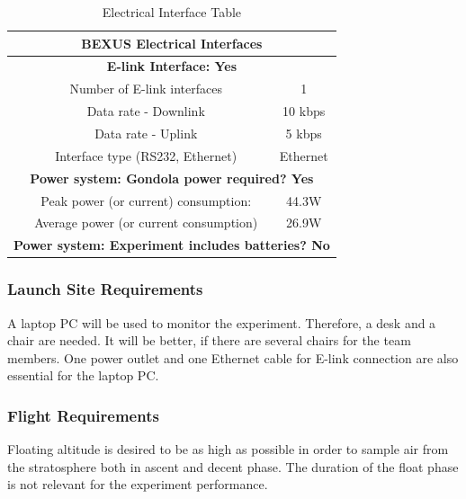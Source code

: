 \documentclass[a4paper,12pt,twoside]{article}
\begin{document}
\begin{table}[H]
\centering
\begin{tabular}{|c|c|c|}
\hline
\multicolumn{3}{|c|}{\textbf{BEXUS Electrical Interfaces}}                     \\ \hline
\multicolumn{3}{|c|}{\textbf{E-link Interface: Yes}}                           \\ \hline
\multirow{4}{*}{}    & Number of E-link interfaces               & 1           \\ \cline{2-3} 
                     & Data rate - Downlink                      & 10 kbps     \\ \cline{2-3} 
                     & Data rate - Uplink                        & 5 kbps      \\ \cline{2-3} 
                     & Interface type (RS232, Ethernet)          & Ethernet    \\ \hline
\multicolumn{3}{|c|}{\textbf{Power system: Gondola power required? Yes}}       \\ \hline
\multirow{2}{*}{}    & Peak power (or current) consumption:      & 44.3W            \\ \cline{2-3} 
                     & Average power (or current consumption)    & 26.9W            \\ \hline
\multicolumn{3}{|l|}{\textbf{Power system: Experiment includes batteries? No}} \\ \hline
\end{tabular}
\caption{Electrical Interface Table}
\label{tab:electrical-interface-table}
\end{table}
\raggedbottom

\subsubsection{Launch Site Requirements}
A laptop PC will be used to monitor the experiment. Therefore, a desk and a chair are needed. It will be better, if there are several chairs for the team members. One power outlet and one Ethernet cable for E-link connection are also essential for the laptop PC.

\subsubsection{Flight Requirements}

Floating altitude is desired to be as high as possible in order to sample air from the stratosphere both in ascent and decent phase. The duration of the float phase is not relevant for the experiment performance. 
\end{document}
